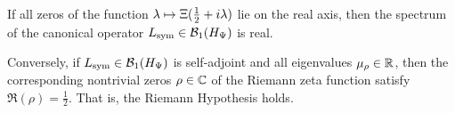 \begin{lemma}
\label{lem:reality_of_spectrum_and_rh}
If all zeros of the function \( \lambda \mapsto \Xi(\tfrac{1}{2} + i\lambda) \) lie on the real axis, then the spectrum of the canonical operator \( L_{\mathrm{sym}} \in \mathcal{B}_1(H_{\Psi}) \) is real.

Conversely, if \( L_{\mathrm{sym}} \in \mathcal{B}_1(H_{\Psi}) \) is self-adjoint and all eigenvalues \( \mu_\rho \in \mathbb{R} \), then the corresponding nontrivial zeros \( \rho \in \mathbb{C} \) of the Riemann zeta function satisfy \( \Re(\rho) = \tfrac{1}{2} \). That is, the Riemann Hypothesis holds.
\end{lemma}
